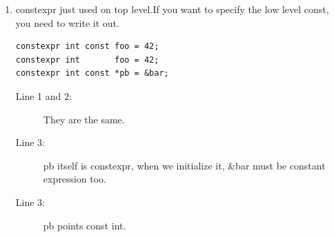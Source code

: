 \documentclass[a4paper,11pt,twoside]{book}
\begin{document}
\begin{itemize}
\begin{enumerate}
		\item constexpr just used on top level.If you want to specify the low level const, you need to write it out.
\begin{lstlisting}
constexpr int const foo = 42;
constexpr int       foo = 42; 
constexpr int const *pb = &bar; 
\end{lstlisting}
	\begin{description}
		\item[Line 1 and 2:] They are the same.
		\item[Line 3:] pb itself is constexpr, when we initialize it, \&bar must be constant expression too.
		\item[Line 3:] pb points const int.
	\end{description}
	\end{enumerate}


\end{itemize}
\end{document}

